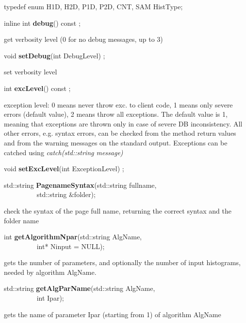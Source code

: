 \item   typedef enum { H1D, H2D, P1D, P2D, CNT, SAM} HistType;
\item    inline int {\bf debug}() const ;

 get verbosity level (0 for no debug messages, up to 3)


\item    void {\bf setDebug}(int DebugLevel) ;

 set verbosity level


\item    int {\bf excLevel}() const ;

 exception level: 0 means never throw exc. to client code, 1 means only
 severe errors (default value), 2 means throw all exceptions.
 The default value is 1, meaning that exceptions are thrown only in
 case of severe DB inconsistency. All other errors, e.g. syntax errors,
 can be checked from the method return values and from the warning
 messages on the standard output.
 Exceptions can be catched using {\it catch(std::string message)}


\item    void {\bf setExcLevel}(int ExceptionLevel) ;




\item    std::string {\bf PagenameSyntax}(std::string fullname,\\\mbox{}~~~~~~~~~ std::string \&folder);


 check the syntax of the page full name, returning the correct syntax and the folder name 


\item    int {\bf getAlgorithmNpar}(std::string AlgName,\\\mbox{}~~~~~~~~~
		       int* Ninput = NULL);

 gets the number of parameters, and optionally the number of input histograms, needed by algorithm AlgName.


\item    std::string {\bf getAlgParName}(std::string AlgName,\\\mbox{}~~~~~~~~~
			    int Ipar);

 gets the name of parameter Ipar (starting from 1) of algorithm AlgName


